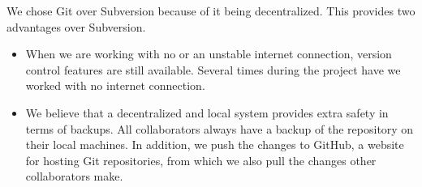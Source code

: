 We chose Git over Subversion because of it being decentralized. This provides two advantages over Subversion.

\begin{itemize}
\item When we are working with no or an unstable internet connection, version control features are still available. Several times during the project have we worked with no internet connection.
\item We believe that a decentralized and local system provides extra safety in terms of backups. All collaborators always have a backup of the repository on their local machines. In addition, we push the changes to GitHub, a website for hosting Git repositories, from which we also pull the changes other collaborators make.
\end{itemize}

